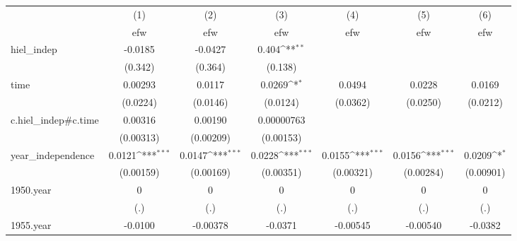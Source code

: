 {
\def\sym#1{\ifmmode^{#1}\else\(^{#1}\)\fi}
\begin{tabular}{l*{6}{c}}
\hline\hline
            &\multicolumn{1}{c}{(1)}&\multicolumn{1}{c}{(2)}&\multicolumn{1}{c}{(3)}&\multicolumn{1}{c}{(4)}&\multicolumn{1}{c}{(5)}&\multicolumn{1}{c}{(6)}\\
            &\multicolumn{1}{c}{efw}&\multicolumn{1}{c}{efw}&\multicolumn{1}{c}{efw}&\multicolumn{1}{c}{efw}&\multicolumn{1}{c}{efw}&\multicolumn{1}{c}{efw}\\
\hline
hiel\_indep  &     -0.0185         &     -0.0427         &       0.404\sym{**} &                     &                     &                     \\
            &     (0.342)         &     (0.364)         &     (0.138)         &                     &                     &                     \\
[1em]
time        &     0.00293         &      0.0117         &      0.0269\sym{*}  &      0.0494         &      0.0228         &      0.0169         \\
            &    (0.0224)         &    (0.0146)         &    (0.0124)         &    (0.0362)         &    (0.0250)         &    (0.0212)         \\
[1em]
c.hiel\_indep#c.time&     0.00316         &     0.00190         &  0.00000763         &                     &                     &                     \\
            &   (0.00313)         &   (0.00209)         &   (0.00153)         &                     &                     &                     \\
[1em]
year\_independence&      0.0121\sym{***}&      0.0147\sym{***}&      0.0228\sym{***}&      0.0155\sym{***}&      0.0156\sym{***}&      0.0209\sym{*}  \\
            &   (0.00159)         &   (0.00169)         &   (0.00351)         &   (0.00321)         &   (0.00284)         &   (0.00901)         \\
[1em]
1950.year   &           0         &           0         &           0         &           0         &           0         &           0         \\
            &         (.)         &         (.)         &         (.)         &         (.)         &         (.)         &         (.)         \\
[1em]
1955.year   &     -0.0100         &    -0.00378         &     -0.0371         &    -0.00545         &    -0.00540         &     -0.0382         \\

\end{tabular}}
